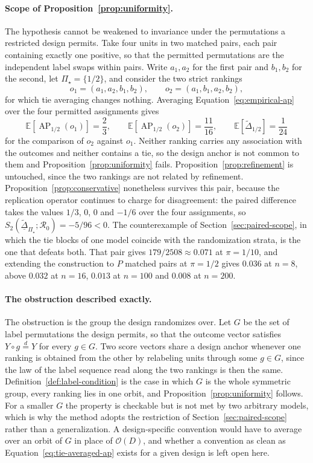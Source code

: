 \documentclass[11pt]{article}
\newcommand{\AP}{\operatorname{AP}}
\newcommand{\Regime}{\mathcal{R}}
\newcommand{\PSet}{\Pi_\star}
\newcommand{\E}{\mathbb{E}}
\newcommand{\Dta}{\widetilde{\Delta}}
\newcommand{\RobDta}{\underline{\widetilde{\Delta}}_{\PSet}}
\theoremstyle{remark}
\begin{document}
\paragraph{Scope of Proposition~\ref{prop:uniformity}.}
The hypothesis cannot be weakened to invariance under the permutations a restricted design permits. Take four units in two matched pairs, each pair containing exactly one positive, so that the permitted permutations are the independent label swaps within pairs. Write $a_1,a_2$ for the first pair and $b_1,b_2$ for the second, let $\PSet=\{1/2\}$, and consider the two strict rankings
\[
o_1=(a_1,a_2,b_1,b_2),
\qquad
o_2=(a_1,b_1,a_2,b_2),
\]
for which tie averaging changes nothing. Averaging Equation~\eqref{eq:empirical-ap} over the four permitted assignments gives
\[
\E\left[\AP_{1/2}(o_1)\right]=\frac23,
\qquad
\E\left[\AP_{1/2}(o_2)\right]=\frac{11}{16},
\qquad
\E\left[\Dta_{1/2}\right]=\frac{1}{24}
\]
for the comparison of $o_2$ against $o_1$. Neither ranking carries any association with the outcomes and neither contains a tie, so the design anchor is not common to them and Proposition~\ref{prop:uniformity} fails. Proposition~\ref{prop:refinement} is untouched, since the two rankings are not related by refinement. Proposition~\ref{prop:conservative} nonetheless survives this pair, because the replication operator continues to charge for disagreement: the paired difference takes the values $1/3$, $0$, $0$ and $-1/6$ over the four assignments, so $S_2(\RobDta;\Regime_0)=-5/96<0$. The counterexample of Section~\ref{sec:paired-scope}, in which the tie blocks of one model coincide with the randomization strata, is the one that defeats both. That pair gives $179/2508\approx0.071$ at $\pi=1/10$, and extending the construction to $P$ matched pairs at $\pi=1/2$ gives $0.036$ at $n=8$, above $0.032$ at $n=16$, $0.013$ at $n=100$ and $0.008$ at $n=200$.

\paragraph{The obstruction described exactly.}
The obstruction is the group the design randomizes over. Let $G$ be the set of label permutations the design permits, so that the outcome vector satisfies $Y\circ g\overset{d}{=}Y$ for every $g\in G$. Two score vectors share a design anchor whenever one ranking is obtained from the other by relabeling units through some $g\in G$, since the law of the label sequence read along the two rankings is then the same. Definition~\ref{def:label-condition} is the case in which $G$ is the whole symmetric group, every ranking lies in one orbit, and Proposition~\ref{prop:uniformity} follows. For a smaller $G$ the property is checkable but is not met by two arbitrary models, which is why the method adopts the restriction of Section~\ref{sec:paired-scope} rather than a generalization. A design-specific convention would have to average over an orbit of $G$ in place of $\mathcal{O}(D)$, and whether a convention as clean as Equation~\eqref{eq:tie-averaged-ap} exists for a given design is left open here.
\end{document}

